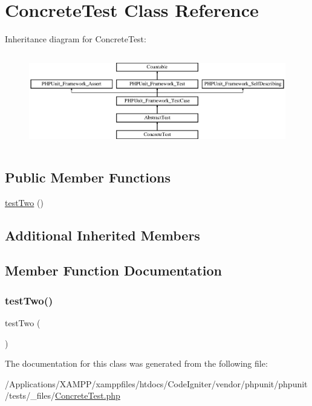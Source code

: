 \hypertarget{class_concrete_test}{}\section{Concrete\+Test Class Reference}
\label{class_concrete_test}
Inheritance diagram for Concrete\+Test\+:\begin{figure}[H]
\begin{center}
\leavevmode
\includegraphics[height=4.129793cm]{class_concrete_test}
\end{center}
\end{figure}
\subsection*{Public Member Functions}
\begin{DoxyCompactItemize}
\item 
\mbox{\hyperlink{class_concrete_test_a4fb9974ce113d5d1db8075e0db0dc9b6}{test\+Two}} ()
\end{DoxyCompactItemize}
\subsection*{Additional Inherited Members}


\subsection{Member Function Documentation}
\mbox{\label{class_concrete_test_a4fb9974ce113d5d1db8075e0db0dc9b6}} 
\subsubsection{\texorpdfstring{test\+Two()}{testTwo()}}
{\footnotesize\ttfamily test\+Two (\begin{DoxyParamCaption}{ }\end{DoxyParamCaption})}



The documentation for this class was generated from the following file\+:\begin{DoxyCompactItemize}
\item 
/\+Applications/\+X\+A\+M\+P\+P/xamppfiles/htdocs/\+Code\+Igniter/vendor/phpunit/phpunit/tests/\+\_\+files/\mbox{\hyperlink{_concrete_test_8php}{Concrete\+Test.\+php}}\end{DoxyCompactItemize}

